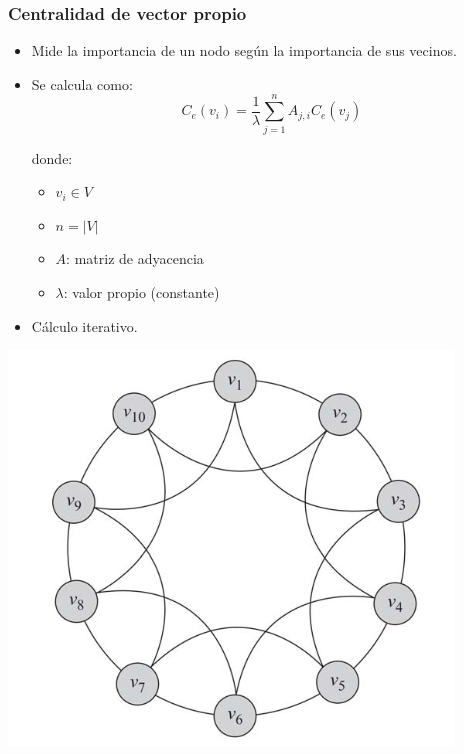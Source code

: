 \documentclass[
10pt, %
aspectratio=169, %
]{beamer}
\begin{document}
	\begin{frame}
		
		\frametitle{Centralidad de vector propio}
		
		\begin{minipage}{0.45\textwidth}
			
			\begin{itemize}
				\item Mide la importancia de un nodo según la importancia de sus vecinos.
				
				\item Se calcula como:
				$$C_e(v_i) = \frac{1}{\lambda} \sum_{j = 1}^{n} A_{j, i}C_e(v_j)$$
				
				donde:
				\begin{itemize}
					\item $v_i \in V$
					\item $n = |V|$
					\item $A$: matriz de adyacencia
					\item $\lambda$: valor propio (constante)
				\end{itemize}
				
				\item Cálculo iterativo.
			\end{itemize}
			
		\end{minipage}%
		\hfill
		\begin{minipage}{0.45\textwidth}
			
			\centering
			\includegraphics[scale=0.35]{anillo-regular.png}
			
		\end{minipage}%
		
	\end{frame}
	
\end{document}
